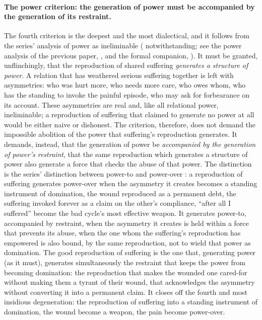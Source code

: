 \paragraph{The power criterion: the generation of power must be accompanied by the generation of its restraint.}
The fourth criterion is the deepest and the most dialectical, and it follows from the series' analysis of power as ineliminable ( notwithstanding; see the power analysis of the previous paper, \cite{paperxvii}, and the formal companion, \cite{wan2026braid}). It must be granted, unflinchingly, that the reproduction of shared suffering \emph{generates a structure of power}. A relation that has weathered serious suffering together is left with asymmetries: who was hurt more, who needs more care, who owes whom, who has the standing to invoke the painful episode, who may ask for forbearance on its account. These asymmetries are real and, like all relational power, ineliminable; a reproduction of suffering that claimed to generate no power at all would be either naive or dishonest. The criterion, therefore, does not demand the impossible abolition of the power that suffering's reproduction generates. It demands, instead, that the generation of power be \emph{accompanied by the generation of power's restraint}, that the same reproduction which generates a structure of power also generate a force that checks the abuse of that power. The distinction is the series' distinction between power-to and power-over \parencite{paperxvii}: a reproduction of suffering generates power-over when the asymmetry it creates becomes a standing instrument of domination, the wound reproduced as a permanent debt, the suffering invoked forever as a claim on the other's compliance, ``after all I suffered'' become the bad cycle's most effective weapon. It generates power-to, accompanied by restraint, when the asymmetry it creates is held within a force that prevents its abuse, when the one whom the suffering's reproduction has empowered is also bound, by the same reproduction, not to wield that power as domination. The good reproduction of suffering is the one that, generating power (as it must), generates simultaneously the restraint that keeps the power from becoming domination: the reproduction that makes the wounded one cared-for without making them a tyrant of their wound, that acknowledges the asymmetry without converting it into a permanent claim. It closes off the fourth and most insidious degeneration: the reproduction of suffering into a standing instrument of domination, the wound become a weapon, the pain become power-over.

